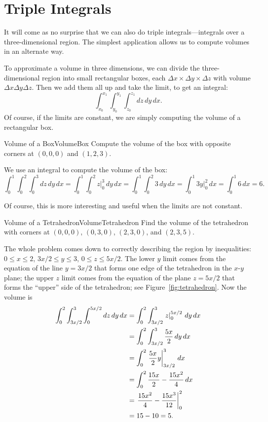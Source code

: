 \section{Triple Integrals}\label{sec:TripleIntegrals}

It will come as no surprise that we can also do triple
integrals---integrals over a three-dimensional region. The simplest
application allows us to compute volumes in an alternate way.

To approximate a volume in three dimensions, we can divide the
three-dimensional region into small rectangular boxes, each 
$\Delta x\times\Delta y\times\Delta z$ with volume
$\Delta x\Delta y\Delta z$. Then we add them all up and take the
limit, to get an integral:
\[\int_{x_0}^{x_1}\int_{y_0}^{y_1}\int_{z_0}^{z_1} dz\,dy\,dx.\]
Of course, if the limits are constant, we are simply computing the
volume of a rectangular box.

\begin{example}{Volume of a Box}{VolumeBox}
Compute the volume of the box with opposite corners at $(0,0,0)$ and $(1,2,3)$.
\end{example}
\begin{solution}
We use an integral to compute the volume of the box:
\[\int_0^1\int_0^2\int_0^3
dz\,dy\,dx=\int_0^1\int_0^2\left.z\right|_0^3 \,dy\,dx
=\int_0^1\int_0^2 3\,dy\,dx
=\int_0^1 \left.3y\right|_0^2 \,dx
=\int_0^1 6\,dx = 6.
\]
\end{solution}

Of course, this is more interesting and useful when the limits are not
constant. 

\begin{example}{Volume of a Tetrahedron}{VolumeTetrahedron}
Find the volume of the tetrahedron with corners at $(0,0,0)$,
$(0,3,0)$, $(2,3,0)$, and $(2,3,5)$.
\end{example}
\begin{solution}
The whole problem comes down to correctly describing the region by
inequalities:
$0\le x\le 2$, $3x/2\le y\le 3$, $0\le z\le 5x/2$.
The lower $y$ limit comes from the equation of the line
$y=3x/2$ that forms one edge of the tetrahedron in the $x$-$y$ plane;
the upper $z$ limit comes from the equation of the plane $z=5x/2$ that
forms the ``upper'' side of the tetrahedron; see Figure~\ref{fig:tetrahedron}. 
Now the volume is 
\begin{align*}
\int_0^2\int_{3x/2}^3\int_0^{5x/2}dz\,dy\,dx
&=\int_0^2\int_{3x/2}^3\left.z\right|_0^{5x/2} \,dy\,dx	\\
&=\int_0^2\int_{3x/2}^3 {5x\over2}\,dy\,dx	\\
&=\int_0^2 \left.{5x\over2}y\right|_{3x/2}^3 \,dx	\\
&=\int_0^2 {15x\over2}-{15x^2\over4}\,dx	\\
&=\left. {15x^2\over4}-{15x^3\over12}\right|_0^2	\\
&=15-10=5.
\end{align*}
\end{solution}

